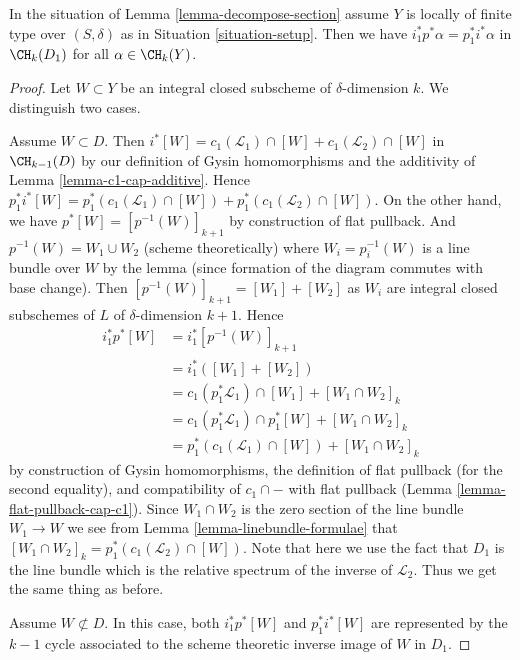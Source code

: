 \begin{lemma}
\label{lemma-decompose-section-formulae}
In the situation of Lemma \ref{lemma-decompose-section}
assume $Y$ is locally of finite type over $(S, \delta)$ as in
Situation \ref{situation-setup}. Then we have
$i_1^*p^*\alpha = p_1^*i^*\alpha$
in $\CH_k(D_1)$ for all $\alpha \in \CH_k(Y)$.
\end{lemma}

\begin{proof}
Let $W \subset Y$ be an integral closed subscheme of $\delta$-dimension $k$.
We distinguish two cases.

\medskip\noindent
Assume $W \subset D$. Then
$i^*[W] = c_1(\mathcal{L}_1) \cap [W] + c_1(\mathcal{L}_2) \cap [W]$
in $\CH_{k - 1}(D)$ by our definition of Gysin homomorphisms and the
additivity of Lemma \ref{lemma-c1-cap-additive}.
Hence $p_1^*i^*[W] =
p_1^*(c_1(\mathcal{L}_1) \cap [W]) + p_1^*(c_1(\mathcal{L}_2) \cap [W])$.
On the other hand, we have
$p^*[W] = [p^{-1}(W)]_{k + 1}$ by construction of flat pullback.
And $p^{-1}(W) = W_1 \cup W_2$ (scheme theoretically)
where $W_i = p_i^{-1}(W)$ is a line bundle over $W$
by the lemma (since formation of the diagram commutes with base change).
Then $[p^{-1}(W)]_{k + 1} = [W_1] + [W_2]$ as $W_i$ are integral closed
subschemes of $L$ of $\delta$-dimension $k + 1$. Hence
\begin{align*}
i_1^*p^*[W]
& =
i_1^*[p^{-1}(W)]_{k + 1} \\
& =
i_1^*([W_1] + [W_2]) \\
& =
c_1(p_1^*\mathcal{L}_1) \cap [W_1] + [W_1 \cap W_2]_k \\
& =
c_1(p_1^*\mathcal{L}_1) \cap p_1^*[W] + [W_1 \cap W_2]_k \\
& =
p_1^*(c_1(\mathcal{L}_1) \cap [W]) + [W_1 \cap W_2]_k
\end{align*}
by construction of Gysin homomorphisms, the definition of flat pullback
(for the second equality), and compatibility of $c_1 \cap -$
with flat pullback (Lemma \ref{lemma-flat-pullback-cap-c1}).
Since $W_1 \cap W_2$ is the zero section of the line bundle
$W_1 \to W$ we see from Lemma \ref{lemma-linebundle-formulae}
that $[W_1 \cap W_2]_k = p_1^*(c_1(\mathcal{L}_2) \cap [W])$.
Note that here we use the fact that $D_1$ is the line bundle
which is the relative spectrum of the inverse of $\mathcal{L}_2$.
Thus we get the same thing as before.

\medskip\noindent
Assume $W \not \subset D$. In this case, both $i_1^*p^*[W]$
and $p_1^*i^*[W]$ are represented by the $k - 1$ cycle associated
to the scheme theoretic inverse image of $W$ in $D_1$.
\end{proof}

